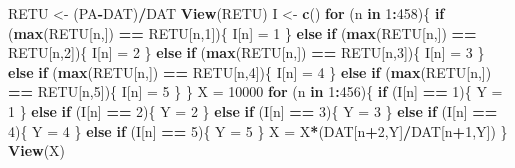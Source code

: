 \documentclass[
  11pt,
]{article}
\newenvironment{Shaded}{\begin{snugshade}}{\end{snugshade}}
\newcommand{\ControlFlowTok}[1]{\textcolor[rgb]{0.13,0.29,0.53}{\textbf{#1}}}
\newcommand{\DecValTok}[1]{\textcolor[rgb]{0.00,0.00,0.81}{#1}}
\newcommand{\KeywordTok}[1]{\textcolor[rgb]{0.13,0.29,0.53}{\textbf{#1}}}
\newcommand{\NormalTok}[1]{#1}
\newcommand{\OperatorTok}[1]{\textcolor[rgb]{0.81,0.36,0.00}{\textbf{#1}}}
\newcommand{\StringTok}[1]{\textcolor[rgb]{0.31,0.60,0.02}{#1}}
\begin{document}
\begin{Shaded}
\begin{Highlighting}[]
\NormalTok{RETU <-}\StringTok{ }\NormalTok{(PA}\OperatorTok{-}\NormalTok{DAT)}\OperatorTok{/}\NormalTok{DAT}
\KeywordTok{View}\NormalTok{(RETU)}
\NormalTok{I <-}\StringTok{ }\KeywordTok{c}\NormalTok{()}
\ControlFlowTok{for}\NormalTok{ (n }\ControlFlowTok{in} \DecValTok{1}\OperatorTok{:}\DecValTok{458}\NormalTok{)\{}
    \ControlFlowTok{if}\NormalTok{ (}\KeywordTok{max}\NormalTok{(RETU[n,]) }\OperatorTok{==}\StringTok{ }\NormalTok{RETU[n,}\DecValTok{1}\NormalTok{])\{}
\NormalTok{        I[n] =}\StringTok{ }\DecValTok{1}
\NormalTok{    \} }\ControlFlowTok{else} \ControlFlowTok{if}\NormalTok{ (}\KeywordTok{max}\NormalTok{(RETU[n,]) }\OperatorTok{==}\StringTok{ }\NormalTok{RETU[n,}\DecValTok{2}\NormalTok{])\{}
\NormalTok{        I[n] =}\StringTok{ }\DecValTok{2}
\NormalTok{    \} }\ControlFlowTok{else} \ControlFlowTok{if}\NormalTok{ (}\KeywordTok{max}\NormalTok{(RETU[n,]) }\OperatorTok{==}\StringTok{ }\NormalTok{RETU[n,}\DecValTok{3}\NormalTok{])\{}
\NormalTok{        I[n] =}\StringTok{ }\DecValTok{3}
\NormalTok{    \} }\ControlFlowTok{else} \ControlFlowTok{if}\NormalTok{ (}\KeywordTok{max}\NormalTok{(RETU[n,]) }\OperatorTok{==}\StringTok{ }\NormalTok{RETU[n,}\DecValTok{4}\NormalTok{])\{}
\NormalTok{        I[n] =}\StringTok{ }\DecValTok{4}
\NormalTok{    \} }\ControlFlowTok{else} \ControlFlowTok{if}\NormalTok{ (}\KeywordTok{max}\NormalTok{(RETU[n,]) }\OperatorTok{==}\StringTok{ }\NormalTok{RETU[n,}\DecValTok{5}\NormalTok{])\{}
\NormalTok{        I[n] =}\StringTok{ }\DecValTok{5}
\NormalTok{    \}}
\NormalTok{\}}
\NormalTok{X =}\StringTok{ }\DecValTok{10000}
\ControlFlowTok{for}\NormalTok{ (n }\ControlFlowTok{in} \DecValTok{1}\OperatorTok{:}\DecValTok{456}\NormalTok{)\{}
    \ControlFlowTok{if}\NormalTok{ (I[n] }\OperatorTok{==}\StringTok{ }\DecValTok{1}\NormalTok{)\{}
\NormalTok{        Y =}\StringTok{ }\DecValTok{1}
\NormalTok{    \} }\ControlFlowTok{else} \ControlFlowTok{if}\NormalTok{ (I[n] }\OperatorTok{==}\StringTok{ }\DecValTok{2}\NormalTok{)\{}
\NormalTok{        Y =}\StringTok{ }\DecValTok{2}
\NormalTok{    \} }\ControlFlowTok{else} \ControlFlowTok{if}\NormalTok{ (I[n] }\OperatorTok{==}\StringTok{ }\DecValTok{3}\NormalTok{)\{}
\NormalTok{        Y =}\StringTok{ }\DecValTok{3}
\NormalTok{    \} }\ControlFlowTok{else} \ControlFlowTok{if}\NormalTok{ (I[n] }\OperatorTok{==}\StringTok{ }\DecValTok{4}\NormalTok{)\{}
\NormalTok{        Y =}\StringTok{ }\DecValTok{4}
\NormalTok{    \} }\ControlFlowTok{else} \ControlFlowTok{if}\NormalTok{ (I[n] }\OperatorTok{==}\StringTok{ }\DecValTok{5}\NormalTok{)\{}
\NormalTok{        Y =}\StringTok{ }\DecValTok{5}
\NormalTok{    \}}
\NormalTok{    X =}\StringTok{ }\NormalTok{X}\OperatorTok{*}\NormalTok{(DAT[n}\OperatorTok{+}\DecValTok{2}\NormalTok{,Y]}\OperatorTok{/}\NormalTok{DAT[n}\OperatorTok{+}\DecValTok{1}\NormalTok{,Y])}
\NormalTok{\}}
\KeywordTok{View}\NormalTok{(X)   }
\end{Highlighting}
\end{Shaded}
\end{document}
